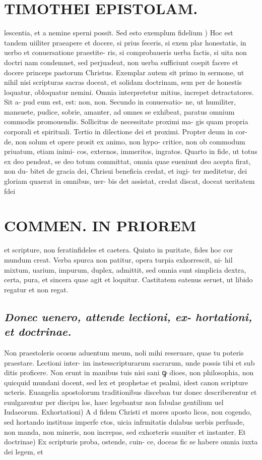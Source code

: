 \documentclass{article}
\begin{document}
\begin{pages}
\section*{TIMOTHEI EPISTOLAM. }
\marginpar{[ p.109 ]}\pstart lescentia, et a nemine sperni possit.  \pend\pstart Sed esto exemplum fidelium ) Hoc est tandem uiiliter praeapere et docere, si prius feceris, si exem plar honestatis, in uerbo et conuersatione praestite- ris, si comprobaueris uerba factis, si uita non doctri nam condemnet, sed perjuadeat, non uerba sufficiunt coepit facere et docere princeps pastorum Christus. Exemplar autem sit primo in sermone, ut nihil nisi scripturas sacras doceat, et solidam doctrinam, sem per de honestis loquatur, obloquatur nemini. Omnia interpretetur mitius, increpet detractatores. Sit a- pud eum est, est: non, non. Secundo in conuersatio- ne, ut humiliter, mansuete, pudice, sobrie, amanter, ad omnes se exhibeat, paratus omnium commodis promouendis. Sollicitus de necessitate proximi ma- gis quam propria corporali et spirituali. Tertio in dilectione dei et proximi. Propter deum in cor- de, non solum et opere prosit ex animo, non hypo- critice, non ob commodum priuatum, etiam inimi- cos, externos, immeritos, ingratos. Quarto in fide, ut totus ex deo pendeat, se deo totum committat, omnia quae eueniunt deo acepta firat, non du- bitet de gracia dei, Chrisui beneficia credat, et iugi- ter meditetur, dei gloriam quaerat in omnibus, uer- bis det assistat, credat discat, doceat ueritatem fdei  \pend
\section*{COMMEN. IN PRIOREM }
\marginpar{[ p.110 ]}\pstart et scripture, non feratinfideles et caetera. Quinto in puritate, fides hoc cor mundum creat. Verba spurca non patitur, opera turpia exhorrescit, ni- hil mixtum, uarium, impurum, duplex, admittit, sed omnia sunt simplicia dextra, certa, pura, et sincera quae agit et loquitur. Castitatem eatenus seruet, ut libido regatur et non regat.  \pend
{}
{}
\subsection*{\textit{Donec uenero, attende lectioni, ex- hortationi, et doctrinae. }}\pstart Non praestoleris ocosus aduentum meum, noli mihi reseruare, quae tu poteris praestare. Lectioni inter- im instesscripturarum sacrarum, unde possis tibi et sub ditis proficere. Non erunt in manibus tuis nisi sani ꝙ dioes, non philosophia, non quicquid mundani docent, sed lex et prophetae et psalmi, idest canon scripture ucteris. Euangelia apostolorum traditionibus disceban tur donec describerentur et euulgarentur per discipu los, haec legebantur non fabulae gentilium uel Iudaeorum.  \pend\pstart Exhortationi) A d fidem Christi et mores aposto licos, non cogendo, sed hortando instituas imperfe ctos, uicia infrmitatis dulabus uerbis perfuade, non manda, non mineris, non increpas, sed exhorteris suauiter et instanter.  \pend\pstart Et doctrinae) Ex scripturis proba, ostende, cuin- ce, doceas fic se habere omnia iuxta dei legem, et  \pend

\end{pages}
\end{document}
